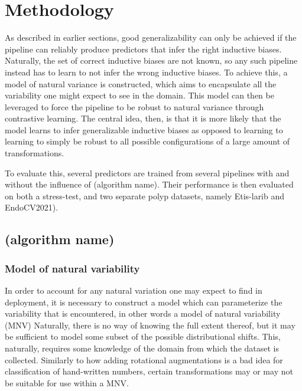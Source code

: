 \chapter*{Methodology}
\setcounter{chapter}{3}
    As described in earlier sections, good generalizability can only be achieved if the pipeline can reliably produce predictors that infer the right inductive biases. Naturally, the set of correct inductive biases are not known, so any such pipeline instead has to learn to not infer the wrong inductive biases. To achieve this, a model of natural variance is constructed, which aims to encapsulate all the variability one might expect to see in the domain. This model can then be leveraged to force the pipeline to be robust to natural variance through contrastive learning.  The central idea, then, is that it is more likely that the model learns to infer generalizable inductive biases as opposed to learning to learning to simply be robust to all possible configurations of a large amount of transformations. 
	
	To evaluate this, several predictors are trained from several pipelines with and without the influence of (algorithm name). Their performance is then evaluated on both a stress-test, and two separate polyp datasets, namely Etis-larib and EndoCV2021). 
\section{(algorithm name)}

  	\subsection{Model of natural variability}
  		In order to account for any natural variation one may expect to find in deployment, it is necessary to construct a model which can parameterize the variability that is encountered, in other words a model of natural variability (MNV) Naturally, there is no way of knowing the full extent thereof, but it may be sufficient to model some subset of the possible distributional shifts. This, naturally, requires some knowledge of the domain from which the dataset is collected. Similarly to how adding rotational augmentations is a bad idea for classification of hand-written numbers, certain transformations may or may not be suitable for use within a MNV.
  		
